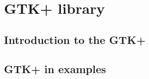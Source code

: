 
\section{GTK+ library}
\label{gtk}

\subsection{Introduction to the GTK+}

\subsection{GTK+ in examples}
